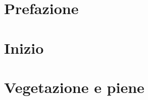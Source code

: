 \documentclass[12pt,a4paper,italian,twoside]{scrbook}
\begin{document}
\frontmatter


\tableofcontents
\listoffigures
\listoftables
\chapter{Prefazione}




\mainmatter
\chapter{Inizio}





\chapter{Vegetazione e piene}







\glsaddall
\backmatter

\manualmark
\markboth{\spacedlowsmallcaps{\glossaryname}}%
{\spacedlowsmallcaps{\glossaryname}}
\pagestyle{scrheadings}
\printglossaries

\printbibliography
\end{document}
